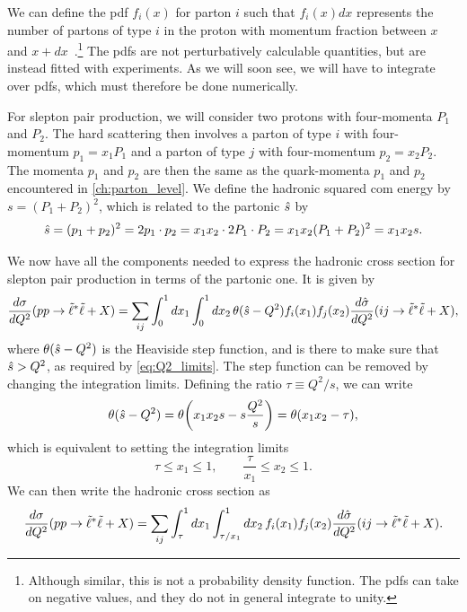 We can define the \acrlong{pdf} $f_i(x)$ for parton $i$ such that $f_i(x)dx$ represents the number of partons of type $i$ in the proton with momentum fraction between $x$ and $x+dx$~\cite{Thomson:2013zua}.\footnote{Although similar, this is not a probability density function. The \glspl{pdf} can take on negative values, and they do not in general integrate to unity.}
The \glspl{pdf} are not perturbatively calculable quantities, but are instead fitted with experiments. As we will soon see, we will have to integrate over \glspl{pdf}, which must therefore be done numerically.

For slepton pair production, we will consider two protons with four-momenta $P_1$ and $P_2$.
The hard scattering then involves a parton of type $i$ with four-momentum $p_1=x_1P_1$ and a parton of type $j$ with four-momentum $p_2=x_2P_2$. The momenta $p_1$ and $p_2$ are then the same as the quark-momenta $p_1$ and $p_2$ encountered in \cref{ch:parton_level}.
We define the hadronic squared \gls{com} energy by $s=(P_1+P_2)^2$, which is related to the partonic $\hat{s}$ by
\begin{equation}
    \hat{s} = (p_1+p_2)^2 = 2p_1 \cdot p_2 = x_1 x_2 \cdot 2P_1\cdot P_2 = x_1 x_2 (P_1+P_2)^2 = x_1 x_2 s.
\end{equation}

We now have all the components needed to express the hadronic cross section for slepton pair production in terms of the partonic one. It is given by~\cite{Ellis:1996mzs}
\begin{equation}
    \frac{d\sigma}{dQ^2}(pp \to {\tilde{\ell}}^*{\tilde{\ell}} + X) = \sum_{ij} \int_0^1 dx_1 \int_0^1 dx_2 \, \theta(\hat{s}-Q^2) f_i(x_1)f_j(x_2) \frac{d\hat\sigma}{dQ^2}(ij \to {\tilde{\ell}}^*{\tilde{\ell}} + X),
\end{equation}
where $\theta(\hat{s}-Q^2)$ is the Heaviside step function, and is there to make sure that $\hat{s} > Q^2$, as required by \cref{eq:Q2_limits}.
The step function can be removed by changing the integration limits. Defining the ratio $\tau \equiv Q^2/s$, we can write
\begin{equation}
    \theta(\hat{s}-Q^2) = \theta\biggl(x_1 x_2 s - s \frac{Q^2}{s}\biggr) = \theta(x_1 x_2 - \tau),
\end{equation}
which is equivalent to setting the integration limits
\begin{equation}
        \tau \leq x_1 \leq 1, \qquad
        \frac{\tau}{x_1} \leq x_2 \leq 1.
\end{equation}
We can then write the hadronic cross section as
\begin{equation}\label{eq:hadron_xsec_general}
    \frac{d\sigma}{dQ^2}(pp \to {\tilde{\ell}}^*{\tilde{\ell}} + X) = \sum_{ij} \int_\tau^1 dx_1 \int_{\tau/x_1}^1 dx_2 \, f_i(x_1) f_j(x_2) \frac{d\hat\sigma}{dQ^2}(ij \to {\tilde{\ell}}^*{\tilde{\ell}} + X).
\end{equation}

